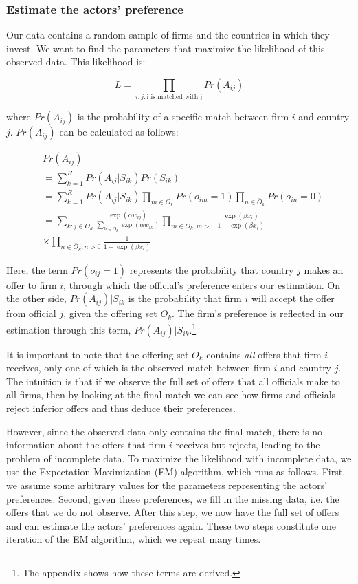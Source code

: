 \subsubsection{Estimate the actors' preference}
\label{sec:tsl_estimate}

Our data contains a random sample of firms and the countries in which they invest. We want to find the parameters that maximize the likelihood of this observed data. This likelihood is:

\[
L = \prod_{i,j: \text{i is matched with j}} Pr(A_{ij})
\]

where $Pr(A_{ij})$ is the probability of a specific match between firm $i$ and country $j$. $Pr(A_{ij})$ can be calculated as follows:

\begin{align}
&Pr(A_{ij}) \\
&= \sum_{k=1}^R Pr(A_{ij}|S_{ik}) Pr(S_{ik}) \\
&= \sum_{k=1}^R Pr(A_{ij} | S_{ik}) \prod_{m \in O_k} Pr(o_{im} = 1) \prod_{n \in \bar O_k} Pr(o_{in} = 0) \\
&= \sum_{k:j \in O_k} \frac{\exp(\alpha w_{ij})}{\displaystyle\sum_{h \in O_k} \exp(\alpha w_{ih})} \prod_{m \in O_k, m > 0} \frac{\exp(\beta x_{i})}{1 + \exp(\beta x_i)} \\
&\times \prod_{n \in \bar O_k, n > 0} \frac{1}{1 + \exp(\beta x_i)}
\end{align}

Here, the term $Pr(o_{ij} = 1)$ represents the probability that country $j$ makes an offer to firm $i$, through which the official's preference enters our estimation. On the other side, $Pr(A_{ij}) | S_{ik}$ is the probability that firm $i$ will accept the offer from official $j$, given the offering set $O_k$. The firm's preference is reflected in our estimation through this term, $Pr(A_{ij})|S_{ik}$.\footnote{The appendix shows how these terms are derived.}

It is important to note that the offering set $O_k$ contains \textit{all} offers that firm $i$ receives, only one of which is the observed match between firm $i$ and country $j$. The intuition is that if we observe the full set of offers that all officials make to all firms, then by looking at the final match we can see how firms and officials reject inferior offers and thus deduce their preferences.

However, since the observed data only contains the final match, there is no information about the offers that firm $i$ receives but rejects, leading to the problem of incomplete data. To maximize the likelihood with incomplete data, we use the Expectation-Maximization (EM) algorithm, which runs as follows. First, we assume some arbitrary values for the parameters representing the actors' preferences. Second, given these preferences, we fill in the missing data, i.e. the offers that we do not observe. After this step, we now have the full set of offers and can estimate the actors' preferences again. These two steps constitute one iteration of the EM algorithm, which we repeat many times. 

